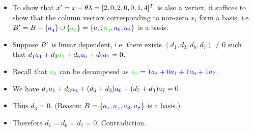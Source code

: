 \documentclass[mathserif]{beamer}
\begin{document}
{ \begin{small}
 \begin{itemize}
  \item To show that  $\mathnormal{x'=x - \theta \lambda} = [ 2,0,2,0,0,1,4]^T$ is also a vertex, it suffices to show that  the column vectors corresponding to non-zero $x_i$ form a basis, i.e. $\mathnormal{B' = B-\{\textcolor{blue}{a_4}\}\cup \{\textcolor{green}{a_3}\} =\{ \textcolor{blue}{a_1}, \textcolor{green}{a_3}, \textcolor{blue}{ a_6}, \textcolor{blue}{a_7} \}}$ is a basis. 
    \item Suppose $\mathnormal{B}'$ is linear dependent, i.e. there exists $(d_1, d_3, d_6, d_7) \neq {0}$ such that $d_1   \textcolor{blue}{\mathnormal{a}_1} + d_3    \textcolor{green}{\mathnormal{a}_3} +  d_6   \textcolor{blue}{\mathnormal{a}_6} +  d_7   \textcolor{blue}{\mathnormal{a}_7}  = 0$.
  \item Recall that   $\textcolor{green}{\mathnormal{a}_3}$ can be decomposed as $\textcolor{green}{\mathnormal{a}_3}  = \textcolor{blue}{1 \mathnormal{a}_{4} + 0 \mathnormal{a}_{1} + 1 \mathnormal{a}_{6} + 1 \mathnormal{a}_{7}}$. 
  \item We have $d_1   \textcolor{blue}{\mathnormal{a}_1} +  d_3 \textcolor{blue}{\mathnormal{a}_{4} }+ (d_6 + d_3)  \textcolor{blue}{\mathnormal{a}_6} +  (d_7 + d_3)  \textcolor{blue}{\mathnormal{a}_7}  = 0$.
  \item Thus $d_3 = 0$. (Reason: $\mathnormal{ B =  \{ \textcolor{blue}{a_1, a_4, a_6, a_7}\}}$ is  a basis.)
  \item Therefore $d_1= d_6 = d_7 =0$. Contradiction. 
 \end{itemize}
\end{small}
}
\end{document}
